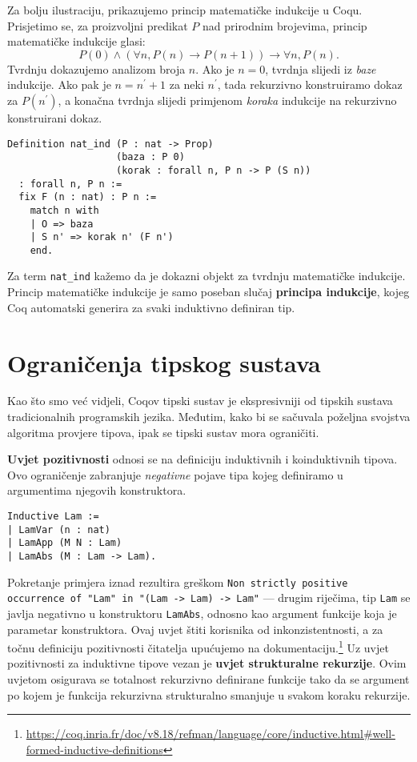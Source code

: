 Za bolju ilustraciju, prikazujemo princip matematičke indukcije u Coqu.
Prisjetimo se, za proizvoljni predikat \(P\) nad prirodnim brojevima, princip matematičke indukcije glasi:
\[
  P(0) \land (\forall n, P(n) \rightarrow P(n + 1)) \rightarrow \forall n, P(n).
\]
\noindent Tvrdnju dokazujemo analizom broja \(n\).
Ako je \(n = 0\), tvrdnja slijedi iz \textit{baze} indukcije.
Ako pak je \(n = n^{\prime} + 1\) za neki \(n^{\prime}\), tada rekurzivno konstruiramo dokaz za \(P(n^{\prime})\), a konačna tvrdnja slijedi primjenom \textit{koraka} indukcije na rekurzivno konstruirani dokaz.
\begin{verbatim}
Definition nat_ind (P : nat -> Prop)
                   (baza : P 0)
                   (korak : forall n, P n -> P (S n))
  : forall n, P n :=
  fix F (n : nat) : P n :=
    match n with
    | O => baza
    | S n' => korak n' (F n')
    end.
\end{verbatim}
Za term \texttt{nat\_ind} kažemo da je dokazni objekt  za tvrdnju matematičke indukcije.
Princip matematičke indukcije je samo poseban slučaj \textbf{principa indukcije}, kojeg Coq automatski generira za svaki induktivno definiran tip.

\section{Ograničenja tipskog sustava}\label{sec:ogranicenja}
Kao što smo već vidjeli, Coqov tipski sustav je ekspresivniji od tipskih sustava tradicionalnih programskih jezika.
Međutim, kako bi se sačuvala poželjna svojstva algoritma provjere tipova, ipak se tipski sustav mora ograničiti.

\textbf{Uvjet pozitivnosti} odnosi se na definiciju induktivnih i koinduktivnih tipova.
Ovo ograničenje zabranjuje \textit{negativne} pojave tipa kojeg definiramo u argumentima njegovih konstruktora.
\begin{verbatim}
Inductive Lam :=
| LamVar (n : nat)
| LamApp (M N : Lam)
| LamAbs (M : Lam -> Lam).
\end{verbatim}
\noindent Pokretanje primjera iznad rezultira greškom \texttt{Non strictly positive occurrence of "Lam" in "(Lam -> Lam) -> Lam"} ---
drugim riječima, tip \texttt{Lam} se javlja negativno u konstruktoru \texttt{LamAbs}, odnosno kao argument funkcije koja je parametar konstruktora.
Ovaj uvjet štiti korisnika od inkonzistentnosti, a za točnu definiciju pozitivnosti čitatelja upućujemo na dokumentaciju.\footnote{\url{https://coq.inria.fr/doc/v8.18/refman/language/core/inductive.html\#well-formed-inductive-definitions}}
Uz uvjet pozitivnosti za induktivne tipove vezan je \textbf{uvjet strukturalne rekurzije}.
Ovim uvjetom osigurava se totalnost rekurzivno definirane funkcije
tako da se argument po kojem je funkcija rekurzivna strukturalno smanjuje u svakom koraku rekurzije.

